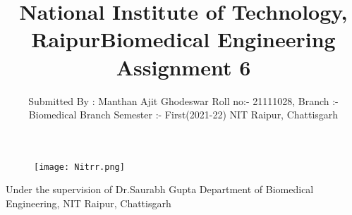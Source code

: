 \documentclass[12pt]{article}
\title{National Institute of Technology, Raipur}
\begin{document}
\maketitle
\begin{figure}[h]
\centering
\texttt{[image: Nitrr.png]}
\end{figure}
\bigskip
\bigskip
\centering
\begin{Large}
\title{Biomedical Engineering Assignment 6}
\end{Large}

\bigskip
\bigskip
\bigskip
\bigskip

\raggedright 
\begin{multicols}{2}
\author{Submitted By : Manthan Ajit Ghodeswar
\linebreak Roll no:- 21111028,
\linebreak Branch :- Biomedical Branch
\linebreak Semester :- First(2021-22)
\linebreak NIT Raipur, Chattisgarh}
\columnbreak
\columnbreak


Under the supervision of
\linebreak Dr.Saurabh Gupta
\linebreak Department of Biomedical Engineering,
\linebreak NIT Raipur, Chattisgarh
\end{multicols}


\clearpage

\centering
\tableofcontents
\clearpage

\raggedright
\end{document}
